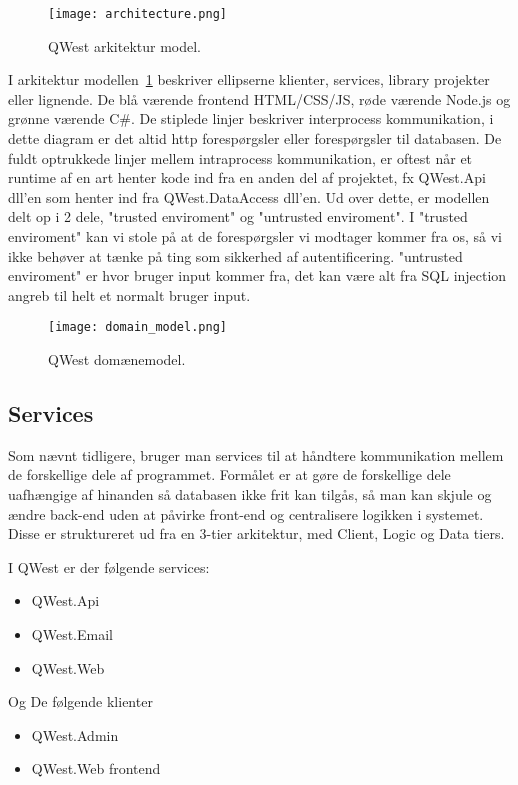 \begin{figure}
    \texttt{[image: architecture.png]}
    \caption{QWest arkitektur model.}
    \label{fig:architecture_model}
\end{figure}

I arkitektur modellen~\ref{fig:architecture_model} beskriver ellipserne klienter, services, library projekter eller lignende. De blå værende frontend HTML/CSS/JS, røde værende Node.js\cite{nodejs} og grønne værende C\#.
De stiplede linjer beskriver interprocess kommunikation, i dette diagram er det altid http forespørgsler eller forespørgsler til databasen.
De fuldt optrukkede linjer mellem intraprocess kommunikation, er oftest når et runtime af en art henter kode ind fra en anden del af projektet, fx QWest.Api dll'en som henter ind fra QWest.DataAccess dll'en.
Ud over dette, er modellen delt op i 2 dele, "trusted enviroment" og "untrusted enviroment". I "trusted enviroment" kan vi stole på at de forespørgsler vi modtager kommer fra os, så vi ikke behøver at tænke på ting som sikkerhed af autentificering. "untrusted enviroment" er hvor bruger input kommer fra, det kan være alt fra SQL injection angreb til helt et normalt bruger input.

\begin{figure}
    \texttt{[image: domain\_model.png]}
    \caption{QWest domænemodel.}
    \label{fig:domain_model}
\end{figure}

\subsection{Services}\label{sec:servicesArc}
Som nævnt tidligere, bruger man services til at håndtere kommunikation mellem de forskellige dele af programmet. Formålet er at gøre de forskellige dele uafhængige af hinanden så databasen ikke frit kan tilgås, så man kan skjule og ændre back-end uden at påvirke front-end og centralisere logikken i systemet. Disse er struktureret ud fra en 3-tier arkitektur\cite{3tier}, med Client, Logic og Data tiers.

I QWest er der følgende services:
\begin{itemize}\label{services}
    \item QWest.Api
    \item QWest.Email
    \item QWest.Web
\end{itemize}

Og De følgende klienter
\begin{itemize}\label{services}
    \item QWest.Admin
    \item QWest.Web frontend
\end{itemize}

